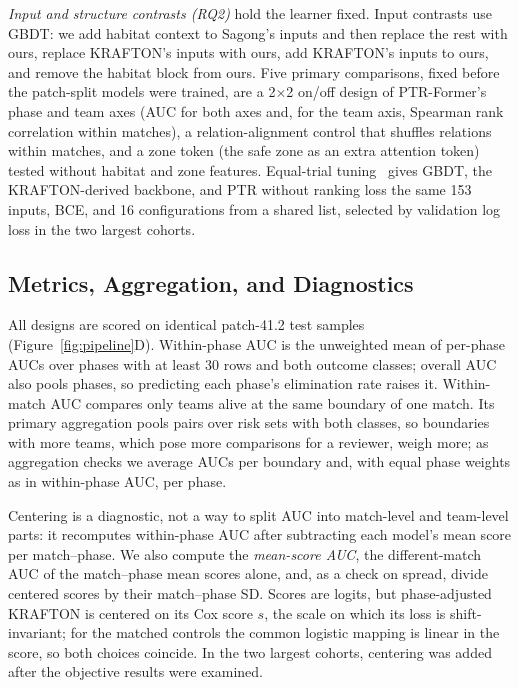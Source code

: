 \documentclass[sigconf,anonymous]{acmart}
\begin{document}
\emph{Input and structure contrasts (RQ2)} hold the learner fixed. Input contrasts use GBDT: we add habitat context to Sagong's inputs and then replace the rest with ours, replace KRAFTON's inputs with ours, add KRAFTON's inputs to ours, and remove the habitat block from ours. Five primary comparisons, fixed before the patch-split models were trained, are a 2$\times$2 on/off design of PTR-Former's phase and team axes (AUC for both axes and, for the team axis, Spearman rank correlation within matches), a relation-alignment control that shuffles relations within matches, and a zone token (the safe zone as an extra attention token) tested without habitat and zone features. Equal-trial tuning~\cite{Bergstra12,Cawley10} gives GBDT, the KRAFTON-derived backbone, and PTR without ranking loss the same 153 inputs, BCE, and 16 configurations from a shared list, selected by validation log loss in the two largest cohorts.

\subsection{Metrics, Aggregation, and Diagnostics}
\label{sec:method:units}
All designs are scored on identical patch-41.2 test samples (Figure~\ref{fig:pipeline}D). Within-phase AUC is the unweighted mean of per-phase AUCs over phases with at least 30 rows and both outcome classes; overall AUC also pools phases, so predicting each phase's elimination rate raises it. Within-match AUC compares only teams alive at the same boundary of one match. Its primary aggregation pools pairs over risk sets with both classes, so boundaries with more teams, which pose more comparisons for a reviewer, weigh more; as aggregation checks we average AUCs per boundary and, with equal phase weights as in within-phase AUC, per phase.

Centering is a diagnostic, not a way to split AUC into match-level and team-level parts: it recomputes within-phase AUC after subtracting each model's mean score per match--phase. We also compute the \emph{mean-score AUC}, the different-match AUC of the match--phase mean scores alone, and, as a check on spread, divide centered scores by their match--phase SD. Scores are logits, but phase-adjusted KRAFTON is centered on its Cox score $s$, the scale on which its loss is shift-invariant; for the matched controls the common logistic mapping is linear in the score, so both choices coincide. In the two largest cohorts, centering was added after the objective results were examined.
\end{document}
